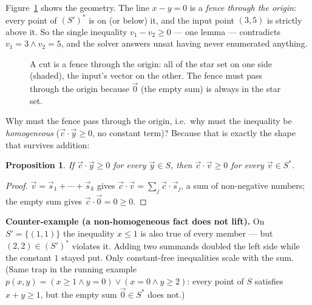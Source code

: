 \documentclass[11pt]{article}
\newcommand{\Sset}{\ensuremath{S}}
\newcommand{\Sstar}{\ensuremath{S^{*}}}
\newcommand{\vv}{\ensuremath{\vec{v}}\xspace}
\newcommand{\vy}{\ensuremath{\vec{y}}\xspace}
\newcommand{\vc}{\ensuremath{\vec{c}}\xspace}
\newcommand{\vzero}{\ensuremath{\vec{0}}\xspace}
\newtheorem{proposition}{Proposition}
\begin{document}
Figure~\ref{fig:fence} shows the geometry. The line $x - y = 0$ is a
\emph{fence through the origin}: every point of $(S')^{*}$ is on (or
below) it, and the input point $(3,5)$ is strictly above it. So the single
inequality $v_1 - v_2 \ge 0$ --- one lemma --- contradicts
$v_1 = 3 \wedge v_2 = 5$, and the solver answers \textsf{unsat} having
never enumerated anything.

\begin{figure}[h]
\centering
{}
\caption{A cut is a fence through the origin: all of the star set on one
side (shaded), the input's vector on the other. The fence must pass
through the origin because $\vzero$ (the empty sum) is always in the star
set.}
\label{fig:fence}
\end{figure}

Why must the fence pass through the origin, i.e.\ why must the inequality
be \emph{homogeneous} ($\vc \cdot \vy \ge 0$, no constant term)? Because
that is exactly the shape that survives addition:

\begin{proposition}
If $\vc \cdot \vy \ge 0$ for every $\vy \in \Sset$, then
$\vc \cdot \vv \ge 0$ for every $\vv \in \Sstar$.
\end{proposition}
\begin{proof}
$\vv = \vec{s}_1 + \cdots + \vec{s}_k$ gives
$\vc \cdot \vv = \sum_j \vc \cdot \vec{s}_j$, a sum of non-negative
numbers; the empty sum gives $\vc \cdot \vzero = 0 \ge 0$.
\end{proof}

\begin{exbox}
\textbf{Counter-example (a non-homogeneous fact does not lift).} On
$\Sset' = \{(1,1)\}$ the inequality $x \le 1$ is also true of every
member --- but $(2,2) \in (S')^{*}$ violates it. Adding two summands
doubled the left side while the constant $1$ stayed put. Only
constant-free inequalities scale with the sum. (Same trap in the running
example $p(x,y) = (x{\ge}1 \wedge y{=}0) \vee (x{=}0 \wedge y{\ge}2)$:
every point of $\Sset$ satisfies $x + y \ge 1$, but the empty sum
$\vzero \in \Sstar$ does not.)
\end{exbox}
\end{document}
